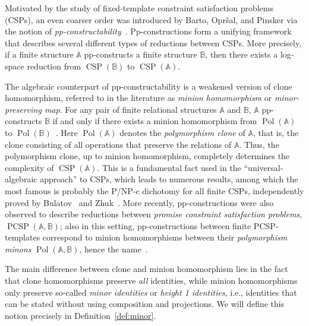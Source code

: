 \documentclass[12pt]{amsart}
\theoremstyle{definition}
\theoremstyle{definition}
\newcommand{\struct}[1]{\mathbb{#1}}
\DeclareMathOperator{\CSP}{CSP}
\DeclareMathOperator{\PCSP}{PCSP}
\DeclareMathOperator{\Pol}{Pol}
\begin{document}
Motivated by the study of fixed-template constraint satisfaction problems (CSPs), an even coarser order was introduced by Barto, Opr\v{s}al, and Pinsker via the notion of \emph{pp-constructability}~\cite{wonderland}. Pp-constructions form a unifying framework that describes several different types of reductions between CSPs. More precisely, if a finite structure $\struct{A}$ pp-constructs a finite structure $\struct{B}$, then there exists a log-space reduction from $\CSP(\struct{B})$ to $\CSP(\struct{A})$. 

The algebraic counterpart of pp-constructability is a weakened version of clone homomorphism, referred to in the literature as \emph{minion homomorphism} or \emph{minor-preserving map}. For any pair of finite relational structures $\struct{A}$ and $\struct{B}$, $\struct{A}$ pp-constructs $\struct{B}$ if and only if there exists a minion homomorphism from 
$\Pol(\struct{A})$ to $\Pol(\struct{B})$~\cite{wonderland}. Here $\Pol(\struct{A})$ denotes the \emph{polymorphism clone} of $\struct{A}$, that is, the clone consisting of all operations that preserve the relations of $\struct{A}$. Thus, the polymorphism clone, up to minion homomorphism, completely determines the complexity of $\CSP(\struct{A})$. This is a fundamental fact used in the ``universal-algebraic approach'' to CSPs, which leads to numerous results, among which the most famous is probably the P/NP-c dichotomy for all finite CSPs, independently proved by Bulatov~\cite{BulatovFVConjecture} and Zhuk~\cite{ZhukFVConjecture, ZhukDichotomy}. More recently, pp-constructions were also observed to describe reductions between \emph{promise constraint satisfaction problems, $\PCSP(\struct{A},\struct{B})$}; also in this setting, pp-constructions between finite PCSP-templates correspond to minion homomorphisms between their \emph{polymorphism minons} $\Pol(\struct{A},\struct{B})$, hence the name~\cite{jakubPCSP}.

The main difference between clone and minion homomorphism lies in the fact that clone homomorphisms preserve \emph{all} identities, while minion homomorphisms only preserve so-called \emph{minor identities} or \emph{height 1 identities}, i.e., identities that can be stated without using composition and projections. We will define this notion precisely in Definition~\ref{def:minor}.
\end{document}
